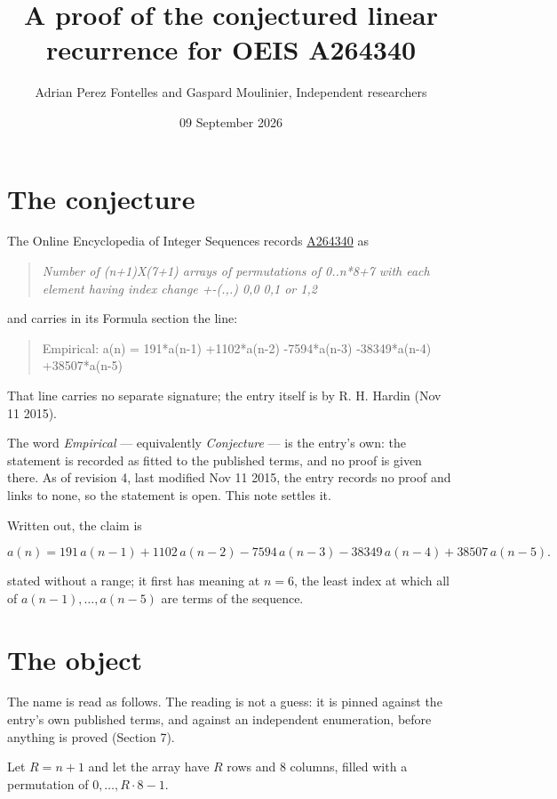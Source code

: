 \documentclass[11pt]{article}
\title{A proof of the conjectured linear recurrence for OEIS A264340}
\author{Adrian Perez Fontelles and Gaspard Moulinier, Independent researchers}
\date{09 September 2026}
\theoremstyle{definition}
\begin{document}
\maketitle
\section{The conjecture}

The Online Encyclopedia of Integer Sequences records \href{https://oeis.org/A264340}{A264340} as

\begin{quote}\itshape Number of (n+1)X(7+1) arrays of permutations of 0..n*8+7 with each element having index change +-(.,.) 0,0 0,1 or 1,2\end{quote}

and carries in its Formula section the line:

\begin{quote}\ttfamily Empirical: a(n) = 191*a(n-1) +1102*a(n-2) -7594*a(n-3) -38349*a(n-4) +38507*a(n-5)\end{quote}

That line carries no separate signature; the entry itself is by R. H. Hardin (Nov 11 2015).

The word {\itshape Empirical} --- equivalently {\itshape Conjecture} --- is the entry's own: the statement is recorded as fitted to the published terms, and no proof is given there. As of revision 4, last modified Nov 11 2015, the entry records no proof and links to none, so the statement is open. This note settles it.

Written out, the claim is

\[a(n) = 191\,a(n-1) + 1102\,a(n-2) - 7594\,a(n-3) - 38349\,a(n-4) + 38507\,a(n-5).\]

stated without a range; it first has meaning at $n = 6$, the least index at which all of $a(n-1),\dots,a(n-5)$ are terms of the sequence.

\section{The object}

The name is read as follows. The reading is not a guess: it is pinned against the entry's own published terms, and against an independent enumeration, before anything is proved (Section 7).

Let $R = n + 1$ and let the array have $R$ rows and $8$ columns, filled with a permutation of $0,\dots,R\cdot8-1$.
\end{document}
